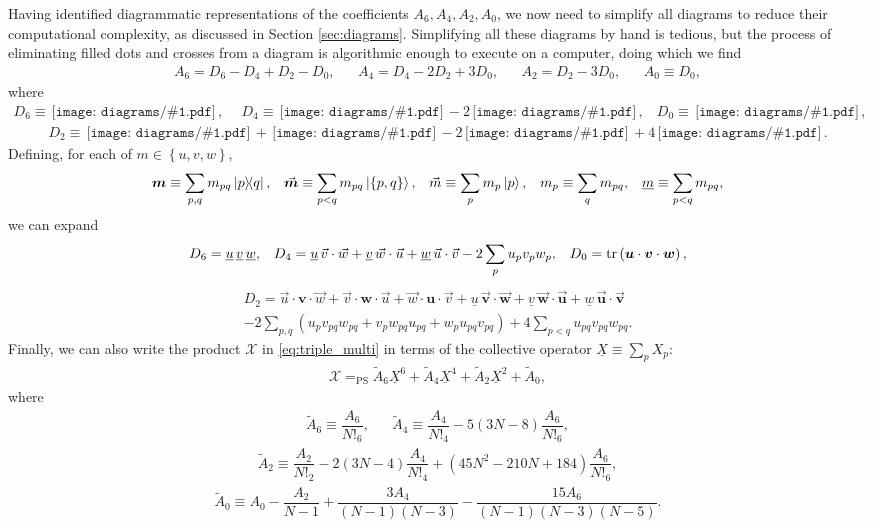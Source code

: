 \documentclass[nofootinbib,notitlepage,11pt]{revtex4-2}
\newcommand{\f}[2]{\dfrac{#1}{#2}} %
\newcommand{\p}[1]{\left(#1\right)} %
\renewcommand{\set}[1]{\left\{#1\right\}} %
\renewcommand{\c}{\cdot} %
\newcommand{\m}{\bm} %
\renewcommand{\v}{\vec} %
\newcommand{\1}{\mathds{1}}
\newcommand{\X}{\mathcal{X}}
\newcommand{\EQPS}{=_{\text{PS}}}
\newcommand{\col}{\underline}
\newcommand{\diagram}[1]
{\,\texttt{[image: diagrams/\#1.pdf]}\,}
\begin{document}
Having identified diagrammatic representations of the coefficients
$A_6,A_4,A_2,A_0$, we now need to simplify all diagrams to reduce
their computational complexity, as discussed in Section
\ref{sec:diagrams}.  Simplifying all these diagrams by hand is
tedious, but the process of eliminating filled dots and crosses from a
diagram is algorithmic enough to execute on a computer, doing which we
find
\begin{align}
  A_6 = D_6 - D_4 + D_2 - D_0,
  &&
  A_4 = D_4 - 2 D_2 + 3 D_0,
  &&
  A_2 = D_2 - 3 D_0,
  &&
  A_0 \equiv D_0,
\end{align}
where
\begin{align}
  D_6 \equiv \diagram{triple_0_o},
  &&
  D_4 \equiv \diagram{triple_01_o} - 2 \diagram{triple_1_o},
  &&
  D_0 \equiv \diagram{triple_0111_o},
\end{align}
\begin{align}
  D_2 \equiv \diagram{triple_011_o}
  + \diagram{triple_02_o}
  - 2 \diagram{triple_11_o}
  + 4 \diagram{triple_2_o}.
\end{align}
Defining, for each of $m\in\set{u,v,w}$,
\begin{align}
  \m m \equiv \sum_{p,q} m_{pq} \op{p}{q},
  &&
  \v{\m m} \equiv \sum_{p<q} m_{pq} \ket{\set{p,q}},
  &&
  \v m \equiv \sum_p m_p \ket{p},
  &&
  m_p \equiv \sum_q m_{pq},
  &&
  \col{m} \equiv \sum_{p<q} m_{pq},
\end{align}
we can expand
\begin{align}
  D_6 = \col{u}\,\col{v}\,\col{w},
  &&
  D_4 = \col{u}\,\v v\c\v w + \col{v}\,\v w\c\v u
  + \col{w}\,\v u\c\v v - 2 \sum_p u_p v_p w_p,
  &&
  D_0 = \tr\p{\m u \c \m v \c \m w},
\end{align}
\begin{multline}
  D_2 = \v u \c\m v\c\v w + \v v \c\m w\c\v u + \v w \c\m u\c\v v
  + \col{u}\,\v{\m v}\c\v{\m w} + \col{v}\,\v{\m w}\c\v{\m u}
  + \col{w}\,\v{\m u}\c\v{\m v} \\
  - 2 \sum_{p,q} \p{u_p v_{pq} w_{pq}
    + v_p w_{pq} u_{pq} + w_p u_{pq} v_{pq}}
  + 4 \sum_{p<q} u_{pq} v_{pq} w_{pq}.
\end{multline}
Finally, we can also write the product $\X$ in \eqref{eq:triple_multi}
in terms of the collective operator $\col{X} \equiv \sum_p X_p$:
\begin{align}
  \X \EQPS
  \tilde A_6 \col{X}^6 + \tilde A_4 \col{X}^4
  + \tilde A_2 \col{X}^2 + \tilde A_0,
  \label{eq:triple_col}
\end{align}
where
\begin{align}
  \tilde A_6 \equiv \f{A_6}{N!_6},
  &&
  \tilde A_4 \equiv \f{A_4}{N!_4} - 5\p{3N-8} \f{A_6}{N!_6},
\end{align}
\begin{align}
  \tilde A_2 \equiv \f{A_2}{N!_2} - 2\p{3N-4} \f{A_4}{N!_4}
  + \p{45N^2-210N+184} \f{A_6}{N!_6},
\end{align}
\begin{align}
  \tilde A_0 \equiv A_0 - \f{A_2}{N-1}
  + \f{3A_4}{\p{N-1}\p{N-3}}
  - \f{15A_6}{\p{N-1}\p{N-3}\p{N-5}}.
\end{align}


\end{document}
